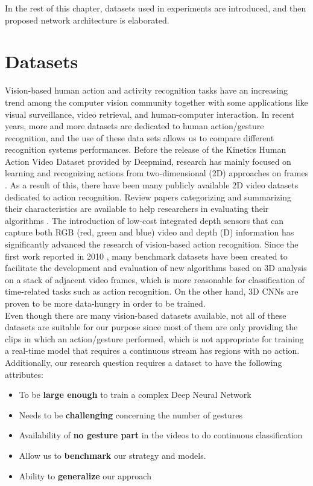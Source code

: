 In the rest of this chapter,  datasets used in experiments are introduced, and then proposed network architecture is elaborated.\\
\clearpage
\section{Datasets}
\label{sec:datasets}
Vision-based human action and activity recognition tasks have an increasing trend among the computer vision community together with some applications like visual surveillance, video retrieval, and human-computer interaction.  In recent years,  more and more datasets are dedicated to human action/gesture recognition, and the use of these data sets allows us to compare different recognition systems performances.    Before the release of the  Kinetics  Human  Action  Video Dataset provided by Deepmind, research has mainly focused on learning and recognizing actions from two-dimensional (2D) approaches on frames \cite{vishwakarma_survey_2012,lim_fuzzy_2015,wang_recent_2003,guo_survey_2014}.  As a result of this,  there have been many publicly available  2D video datasets dedicated to action recognition. Review papers categorizing and summarizing their characteristics are available to help researchers in evaluating their algorithms  \cite{hassner_critical_2013,chaquet_survey_2013,ruffieux_survey_2014}.   The introduction of low-cost integrated depth sensors that can capture both RGB  (red,  green and blue) video and depth (D) information has significantly advanced the research of vision-based action recognition.   Since the first work reported in 2010 \cite{li_action_2010}, many benchmark datasets have been created to facilitate the development and evaluation of new algorithms based on 3D analysis on a stack of adjacent video frames, which is more reasonable for classification of time-related tasks such as action recognition.  On the other hand,  3D CNNs are proven to be more data-hungry in order to be trained.\\

Even though there are many vision-based datasets  available, not all of these datasets are suitable for our purpose since most of them are only providing the clips in which an action/gesture performed, which is not appropriate for training a real-time model that requires a continuous stream has regions with no action. Additionally, our research question requires a dataset to have the following attributes:
\begin{itemize}
\item To be \textbf{large enough} to train  a complex Deep Neural Network
\item Needs to be \textbf{challenging} concerning the number of gestures
\item Availability  of \textbf{no gesture part} in the videos to do continuous  classification
\item Allow us to \textbf{benchmark} our strategy and models.
\item Ability to \textbf{generalize} our approach
\end{itemize}

